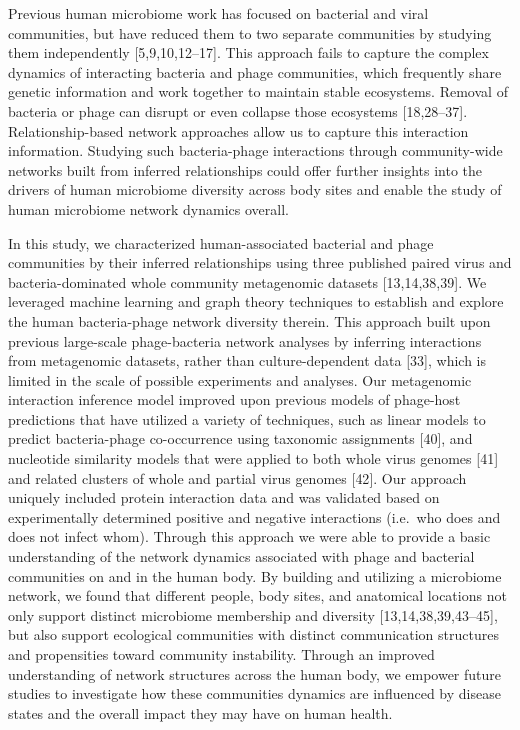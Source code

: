 \documentclass[12pt,]{article}
\begin{document}
Previous human microbiome work has focused on bacterial and viral
communities, but have reduced them to two separate communities by
studying them independently {[}5,9,10,12--17{]}. This approach fails to
capture the complex dynamics of interacting bacteria and phage
communities, which frequently share genetic information and work
together to maintain stable ecosystems. Removal of bacteria or phage can
disrupt or even collapse those ecosystems {[}18,28--37{]}.
Relationship-based network approaches allow us to capture this
interaction information. Studying such bacteria-phage interactions
through community-wide networks built from inferred relationships could
offer further insights into the drivers of human microbiome diversity
across body sites and enable the study of human microbiome network
dynamics overall.

In this study, we characterized human-associated bacterial and phage
communities by their inferred relationships using three published paired
virus and bacteria-dominated whole community metagenomic datasets
{[}13,14,38,39{]}. We leveraged machine learning and graph theory
techniques to establish and explore the human bacteria-phage network
diversity therein. This approach built upon previous large-scale
phage-bacteria network analyses by inferring interactions from
metagenomic datasets, rather than culture-dependent data {[}33{]}, which
is limited in the scale of possible experiments and analyses. Our
metagenomic interaction inference model improved upon previous models of
phage-host predictions that have utilized a variety of techniques, such
as linear models to predict bacteria-phage co-occurrence using taxonomic
assignments {[}40{]}, and nucleotide similarity models that were applied
to both whole virus genomes {[}41{]} and related clusters of whole and
partial virus genomes {[}42{]}. Our approach uniquely included protein
interaction data and was validated based on experimentally determined
positive and negative interactions (i.e.~who does and does not infect
whom). Through this approach we were able to provide a basic
understanding of the network dynamics associated with phage and
bacterial communities on and in the human body. By building and
utilizing a microbiome network, we found that different people, body
sites, and anatomical locations not only support distinct microbiome
membership and diversity {[}13,14,38,39,43--45{]}, but also support
ecological communities with distinct communication structures and
propensities toward community instability. Through an improved
understanding of network structures across the human body, we empower
future studies to investigate how these communities dynamics are
influenced by disease states and the overall impact they may have on
human health.
\end{document}
